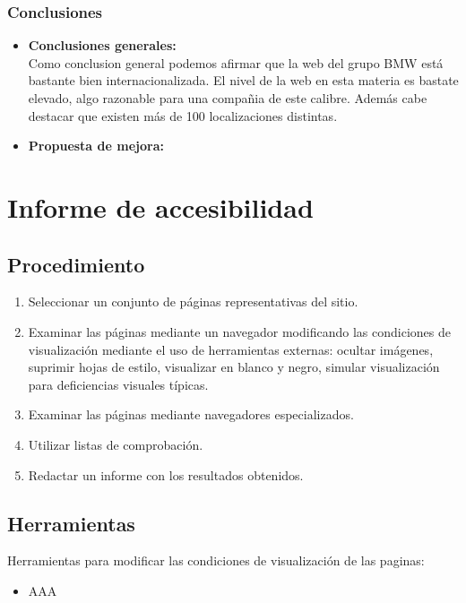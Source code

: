 \documentclass[a4paper,11pt]{article}
\begin{document}
\subsubsection{Conclusiones}
\begin{itemize}
\item \textbf{Conclusiones generales:}\\
Como conclusion general podemos afirmar que la web del grupo BMW está bastante bien internacionalizada. El nivel de la web en esta materia es bastate elevado, algo razonable para una compañia de este calibre. Además cabe destacar que existen más de 100 localizaciones distintas.

\item \textbf{Propuesta de mejora:}\\


\end{itemize}

\section{Informe de accesibilidad}
\subsection{Procedimiento}
\begin{enumerate}
\item Seleccionar un conjunto de páginas representativas del sitio.
\item Examinar las páginas mediante un navegador modificando las condiciones de visualización mediante el uso de herramientas externas: ocultar imágenes, suprimir hojas de estilo, visualizar en blanco y negro, simular visualización para deficiencias visuales típicas.
\item Examinar las páginas mediante navegadores especializados.
\item Utilizar listas de comprobación.
\item Redactar un informe con los resultados obtenidos.
\end{enumerate}


\subsection{Herramientas}
Herramientas para modificar las condiciones de visualización de las paginas:
\begin{itemize}
  \item AAA
\end{itemize}
\end{document}
